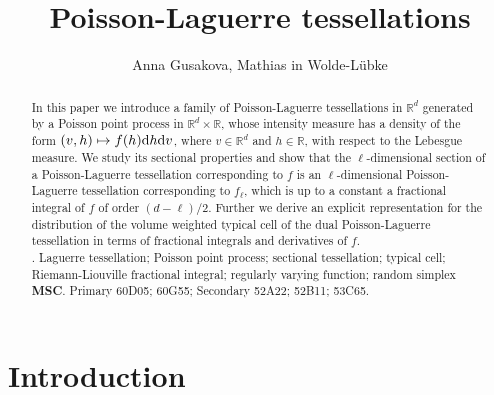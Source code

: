 \documentclass[11pt,a4paper]{article}
\theoremstyle{plain}
\theoremstyle{definition}
\theoremstyle{remark}
\def\RR{\mathbb{R}}
\newcommand{\dint}{\textup{d}}
\begin{document}
\title{\bfseries Poisson-Laguerre tessellations}

\author{Anna Gusakova\footnotemark[1],\; Mathias in Wolde-L\"ubke\footnotemark[2]}

\date{}
\renewcommand{\thefootnote}{\fnsymbol{footnote}}


\maketitle

\begin{abstract}
    In this paper we introduce a family of Poisson-Laguerre tessellations in $\RR^d$ generated by a Poisson point process in $\RR^d\times \RR$, whose intensity measure has a density of the form $(v,h)\mapsto f(h)\dint h\dint v$, where $v\in\RR^d$ and $h\in\RR$, with respect to the Lebesgue measure. We study its sectional properties and show that the $\ell$-dimensional section of a Poisson-Laguerre tessellation corresponding to $f$ is an $\ell$-dimensional Poisson-Laguerre tessellation corresponding to $f_{\ell}$, which is up to a constant a fractional integral of $f$ of order $(d-\ell)/2$. Further we derive an explicit representation for the distribution of the volume weighted typical cell of the dual Poisson-Laguerre tessellation in terms of fractional integrals and derivatives of $f$. \\

. {Laguerre tessellation; Poisson point process; sectional tessellation; typical cell; Riemann-Liouville fractional integral; regularly varying function; random simplex}  \\
{\bf MSC}. Primary 60D05; 60G55; Secondary 52A22; 52B11; 53C65.
\end{abstract}


\tableofcontents

\section{Introduction}
\end{document}
